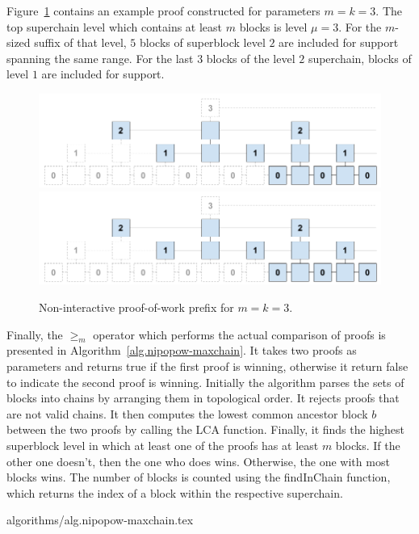 Figure~\ref{fig.nipopow} contains an example proof constructed for parameters
$m = k = 3$. The top superchain level which contains at least $m$ blocks is
level $\mu = 3$. For the $m$-sized suffix of that level, $5$ blocks of
superblock level $2$ are included for support spanning the same range. For the
last $3$ blocks of the level $2$ superchain, blocks of level $1$ are included
for support.

\begin{figure}[h]
    \caption{Non-interactive proof-of-work prefix for $m=k = 3$.}
    \centering
    \iftwocolumn
        \includegraphics[width=\columnwidth,keepaspectratio]{figures/non-interactive-popow.png}
    \else
        \includegraphics[width=0.7\columnwidth,keepaspectratio]{figures/non-interactive-popow.png}
    \fi
    \label{fig.nipopow}
\end{figure}

Finally, the $\geq_m$ operator which performs the actual comparison of proofs
is presented in Algorithm~\ref{alg.nipopow-maxchain}. It takes two proofs as
parameters and returns true if the first proof is winning, otherwise it return
false to indicate the second proof is winning. Initially the algorithm parses
the sets of blocks into chains by arranging them in topological order. It
rejects proofs that are not valid chains. It then computes the lowest common
ancestor block $b$ between the two proofs by calling the LCA function. Finally,
it finds the highest superblock level in which at least one of the proofs has
at least $m$ blocks. If the other one doesn't, then the one who does wins.
Otherwise, the one with most blocks wins. The number of blocks is counted using
the findInChain function, which returns the index of a block within the
respective superchain.

{algorithms/alg.nipopow-maxchain.tex}
